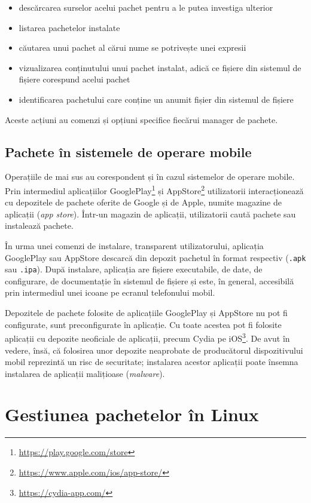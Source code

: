 \begin{itemize}
  \item descărcarea surselor acelui pachet pentru a le putea investiga ulterior
  \item listarea pachetelor instalate
  \item căutarea unui pachet al cărui nume se potrivește unei expresii
  \item vizualizarea conținutului unui pachet instalat, adică ce fișiere din sistemul de fișiere corespund acelui pachet
  \item identificarea pachetului care conține un anumit fișier din sistemul de fișiere
\end{itemize}
Aceste acțiuni au comenzi și opțiuni specifice fiecărui manager de pachete.

\subsection{Pachete în sistemele de operare mobile}
\label{sec:package:mobile}

Operațiile de mai sus au corespondent și în cazul sistemelor de operare mobile.
Prin intermediul aplicațiilor GooglePlay\footnote{\url{https://play.google.com/store}} și AppStore\footnote{\url{https://www.apple.com/ios/app-store/}} utilizatorii interacționează cu depozitele de pachete oferite de Google și de Apple, numite magazine de aplicații (\textit{app store}).
Într-un magazin de aplicații, utilizatorii caută pachete sau instalează pachete.

În urma unei comenzi de instalare, transparent utilizatorului, aplicația GooglePlay sau AppStore descarcă din depozit pachetul în format respectiv (\texttt{.apk} sau \texttt{.ipa}).
După instalare, aplicația are fișiere executabile, de date, de configurare, de documentație în sistemul de fișiere și este, în general, accesibilă prin intermediul unei icoane pe ecranul telefonului mobil.

Depozitele de pachete folosite de aplicațiile GooglePlay și AppStore nu pot fi configurate, sunt preconfigurate în aplicație.
Cu toate acestea pot fi folosite aplicații cu depozite neoficiale de aplicații, precum Cydia pe iOS\footnote{\url{https://cydia-app.com/}}.
De avut în vedere, însă, că folosirea unor depozite neaprobate de producătorul dispozitivului mobil reprezintă un risc de securitate;
instalarea acestor aplicații poate însemna instalarea de aplicații malițioase (\textit{malware}).

\section{Gestiunea pachetelor în Linux}
\label{sec:package:linux}

